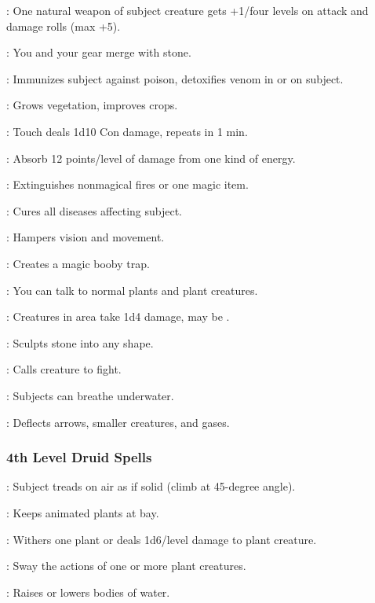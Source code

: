 : One natural weapon of subject creature gets +1/four levels on attack and damage rolls (max +5).

: You and your gear merge with stone.

: Immunizes subject against poison, detoxifies venom in or on subject.

: Grows vegetation, improves crops.

: Touch deals 1d10 Con damage, repeats in 1 min.

: Absorb 12 points/level of damage from one kind of energy.

: Extinguishes nonmagical fires or one magic item.

: Cures all diseases affecting subject.

: Hampers vision and movement.

: Creates a magic booby trap.

: You can talk to normal plants and plant creatures.

: Creatures in area take 1d4 damage, may be .

: Sculpts stone into any shape.

: Calls creature to fight.

: Subjects can breathe underwater.

: Deflects arrows, smaller creatures, and gases.

\subsubsection{4th Level Druid Spells}

: Subject treads on air as if solid (climb at 45-degree angle).

: Keeps animated plants at bay.

: Withers one plant or deals 1d6/level damage to plant creature.

: Sway the actions of one or more plant creatures.

: Raises or lowers bodies of water.

